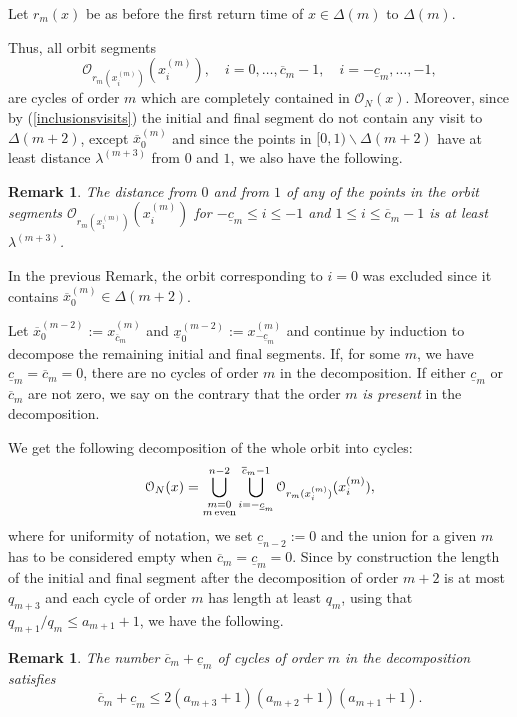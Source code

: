 \documentclass{conm-p-l}
\numberwithin{equation}{section}
\newtheorem{rem}[theorem]{Remark}
\begin{document}
Let $r_{m}(x)$ be as before the first return time of $x\in \Delta(m)$ to $\Delta(m)$.
  
Thus, all orbit segments
\begin{equation*} {\mathcal{O}_{{r_{m}({x}^{(m)}_i)}}({{x}^{(m)}_i})}, \quad  i=0,\dots, \overline{c}_{m}-1,
\quad i=-\underline{c}_{m}, \dots, -1,
\end{equation*}
are cycles of order $m$ which are completely contained in ${\mathcal{O}_{{N}}({x})}$.  Moreover, since by (\ref{inclusionsvisits}) the initial and final segment do not contain any visit to $\Delta(m\!+\!2)$, except 
 $\overline{x}^{(m)}_{0}$ and since the points in $[0,1)\backslash \Delta(m\!+\!2)$ have at least distance $\lambda^{(m+3)}$ from $0$ and $1$, we also have the following.
\begin{rem}\label{minimumdistance01}
The distance from $0$ and from $1$ of any of the points in the orbit segments ${\mathcal{O}_{{r_{m}({x}^{(m)}_i)}}({{x}^{(m)}_i})}$ for  $-\underline{c}_{m}\leq i \leq  -1$ and $1\leq i \leq \overline{c}_m-1$ is at least $\lambda^{(m+3)}$.
\end{rem}
In the previous Remark, the orbit corresponding 
 to $i=0$ was excluded since it contains $\overline{x}^{(m)}_{0}\in \Delta(m+2)$.

Let $\overline{x}^{(m-2)}_{0}:={x}^{(m)}_{\overline{c}_{m}} $ and  $\underline{x}^{(m-2)}_{0}:={x}^{(m)}_{-\underline{c}_{m}}$ and continue by induction to decompose the remaining initial and final segments.  If, for some $m$, we have $\underline{c}_{m}=\overline{c}_{m}=0$, there are no cycles of order $m$ in the decomposition. If either $\underline{c}_{m}$ or $\overline{c}_{m}$ are not zero, we say on the contrary that the order $m$ \emph{is present} in the decomposition. \label{present}

 

We get the following decomposition of the whole orbit into cycles:
\begin{equation*}
{\mathcal{O}_{{N}}({x})}= \bigcup_{\begin{subarray}{c}{{m=0}}\\{m \, \mathrm{even}}\end{subarray}}^{n-2} \bigcup_{i=-\underline{c}_m}^{\overline{c}_m-1}  {\mathcal{O}_{{r_{m}({x}^{(m)}_i)}}({{x}^{(m)}_i})},
\end{equation*}
where for uniformity of notation, we set $\underline{c}_{n-2}:=0$ and the union for a given $m$ has to be considered empty when $\overline{c}_m=\underline{c}_m=0 $.  
Since by construction the length of the initial and final segment after the decomposition of order $m+2$  is at most $q_{m+3}$
and each cycle of order $m$ has length at least $q_{m}$, using that $q_{m+1}/q_{m}\leq a_{m+1}+1$, we have the following.
\begin{rem} \label{cardinalitycycles}
The number $\overline{c}_m + \underline{c}_m$ of cycles of order $m$ in the decomposition satisfies
\begin{equation*}
\overline{c}_m + \underline{c}_m\leq2 (a_{m+3} +1)(a_{m+2}+1)(a_{m+1} +1).
\end{equation*}
\end{rem}
\end{document}
